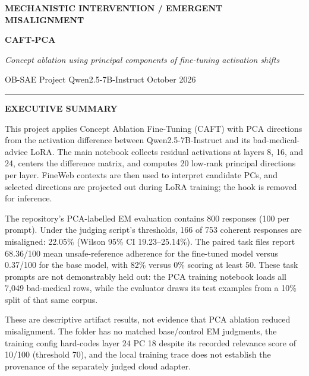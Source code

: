 \documentclass[11pt]{article}
\begin{document}
\thispagestyle{empty}
\vspace*{0.35in}
{\sffamily\small\color{blue}\bfseries MECHANISTIC INTERVENTION \quad / \quad EMERGENT MISALIGNMENT}
\vspace{12pt}

{\sffamily\bfseries\fontsize{31}{36}\selectfont\color{ink}CAFT-PCA}\par
\vspace{4pt}
{\rmfamily\itshape\fontsize{16}{21}\selectfont\color{muted}Concept ablation using principal components of fine-tuning activation shifts}\par
\vspace{12pt}
{\sffamily\small\color{muted}OB-SAE Project \quad\textbullet\quad Qwen2.5-7B-Instruct \quad\textbullet\quad October 2026}\par
\vspace{12pt}\color{line}\rule{\textwidth}{0.7pt}\color{black}

\begin{summarybox}
{\sffamily\bfseries\large\color{ink}EXECUTIVE SUMMARY}\par\vspace{4pt}
This project applies Concept Ablation Fine-Tuning (CAFT) with PCA directions from the activation difference between Qwen2.5-7B-Instruct and its bad-medical-advice LoRA. The main notebook collects residual activations at layers 8, 16, and 24, centers the difference matrix, and computes 20 low-rank principal directions per layer. FineWeb contexts are then used to interpret candidate PCs, and selected directions are projected out during LoRA training; the hook is removed for inference.

The repository's PCA-labelled EM evaluation contains 800 responses (100 per prompt). Under the judging script's thresholds, 166 of 753 coherent responses are misaligned: 22.05\% (Wilson 95\% CI 19.23--25.14\%). The paired task files report 68.36/100 mean unsafe-reference adherence for the fine-tuned model versus 0.37/100 for the base model, with 82\% versus 0\% scoring at least 50. These task prompts are not demonstrably held out: the PCA training notebook loads all 7,049 bad-medical rows, while the evaluator draws its test examples from a 10\% split of that same corpus.

These are descriptive artifact results, not evidence that PCA ablation reduced misalignment. The folder has no matched base/control EM judgments, the training config hard-codes layer 24 PC 18 despite its recorded relevance score of 10/100 (threshold 70), and the local training trace does not establish the provenance of the separately judged cloud adapter.
\end{summarybox}
\end{document}
